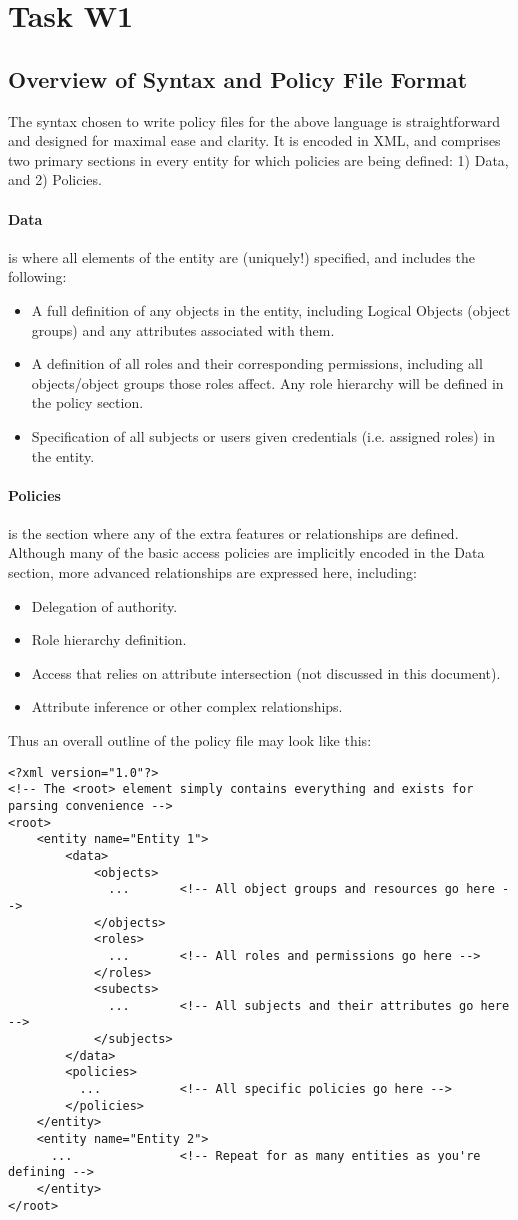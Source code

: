 \documentclass{article}
\providecommand{\task}[1]{\section{Task #1}}
\providecommand{\tightlist}{
    \setlength{\itemsep}{1pt}\setlength{\parskip}{0pt}
}
\begin{document}
\task{W1}
\subsection{Overview of Syntax and Policy File Format}
The syntax chosen to write policy files for the above language is straightforward and designed for maximal ease and clarity. It is encoded in XML, and comprises two primary sections in every entity for which policies are being defined: 1) Data, and 2) Policies.
\paragraph{Data} is where all elements of the entity are (uniquely!) specified, and includes the following:
\begin{itemize}\tightlist
  \item A full definition of any objects in the entity, including Logical Objects (object groups) and any attributes associated with them.
  \item A definition of all roles and their corresponding permissions, including all objects/object groups those roles affect. Any role hierarchy will be defined in the policy section.
  \item Specification of all subjects or users given credentials (i.e. assigned roles) in the entity.
\end{itemize}
\paragraph{Policies} is the section where any of the extra features or relationships are defined. Although many of the basic access policies are implicitly encoded in the Data section, more advanced relationships are expressed here, including:
\begin{itemize}\tightlist
  \item Delegation of authority.
  \item Role hierarchy definition.
  \item Access that relies on attribute intersection (not discussed in this document).
  \item Attribute inference or other complex relationships.
\end{itemize}

Thus an overall outline of the policy file may look like this:
\begin{lstlisting}
<?xml version="1.0"?>
<!-- The <root> element simply contains everything and exists for parsing convenience -->
<root>
    <entity name="Entity 1">
        <data>
            <objects>
              ...       <!-- All object groups and resources go here -->
            </objects>
            <roles>
              ...       <!-- All roles and permissions go here -->
            </roles>
            <subects>
              ...       <!-- All subjects and their attributes go here -->
            </subjects>
        </data>
        <policies>
          ...           <!-- All specific policies go here -->
        </policies>
    </entity>
    <entity name="Entity 2">
      ...               <!-- Repeat for as many entities as you're defining -->
    </entity>
</root>
\end{lstlisting}
\end{document}
